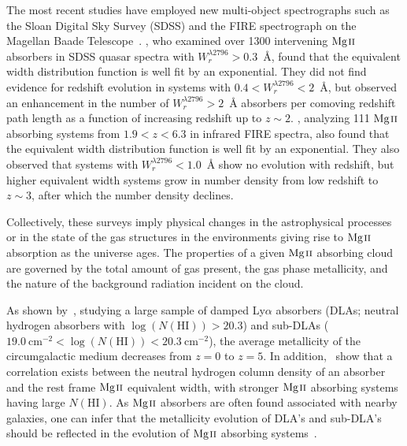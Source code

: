 \documentclass[iop,apj,numberedappendix,appendixfloats,twocolappendix]{emulateapj}
\begin{document}
The most recent studies have employed new multi-object spectrographs such as the Sloan Digital Sky Survey (SDSS) and the FIRE spectrograph on the Magellan Baade Telescope~\citep{Nestor2005,Matejek2012}. \cite{Nestor2005}, who examined over 1300 intervening ${\hbox{{\rm Mg}\kern 0.1em{\sc ii}}}$ absorbers in SDSS quasar spectra with $W_r^{\lambda2796} > 0.3$~{\AA}, found that the equivalent width distribution function is well fit by an exponential. They did not find evidence for redshift evolution in systems with $0.4 < W_r^{\lambda2796} < 2$~{\AA}, but observed an enhancement in the number of $W_r^{\lambda2796} > 2$~{\AA} absorbers per comoving redshift path length as a function of increasing redshift up to $z \sim 2$. \cite{Matejek2012}, analyzing 111 ${\hbox{{\rm Mg}\kern 0.1em{\sc ii}}}$ absorbing systems from $1.9 < z < 6.3$ in infrared FIRE spectra, also found that the equivalent width distribution function is well fit by an exponential. They also observed that systems with $W_r^{\lambda2796} < 1.0$~{\AA} show no evolution with redshift, but higher equivalent width systems grow in number density from low redshift to $z \sim 3$, after which the number density declines.

Collectively, these surveys imply physical changes in the astrophysical processes or in the state of the gas structures in the environments giving rise to ${\hbox{{\rm Mg}\kern 0.1em{\sc ii}}}$ absorption as the universe ages. The properties of a given ${\hbox{{\rm Mg}\kern 0.1em{\sc ii}}}$ absorbing cloud are governed by the total amount of gas present, the gas phase metallicity, and the nature of the background radiation incident on the cloud.

As shown by~\cite{Quiret2016}, studying a large sample of damped Ly$\alpha$ absorbers (DLAs; neutral hydrogen absorbers with $\log(N(\mathrm{HI})) > 20.3$) and sub-DLAs ($19.0~\mathrm{cm^{-2}} < \log(N(\mathrm{HI})) < 20.3~\mathrm{cm^{-2}}$), the average metallicity of the circumgalactic medium decreases from $z = 0$ to $z = 5$. In addition,~\cite{Menard2009} show that a correlation exists between the neutral hydrogen column density of an absorber and the rest frame ${\hbox{{\rm Mg}\kern 0.1em{\sc ii}}}$ equivalent width, with stronger ${\hbox{{\rm Mg}\kern 0.1em{\sc ii}}}$ absorbing systems having large $N(\mathrm{HI})$. As ${\hbox{{\rm Mg}\kern 0.1em{\sc ii}}}$ absorbers are often found associated with nearby galaxies, one can infer that the metallicity evolution of DLA's and sub-DLA's should be reflected in the evolution of ${\hbox{{\rm Mg}\kern 0.1em{\sc ii}}}$ absorbing systems~\citep{Kulkarni2002,Prochaska2003,Kulkarni2005,Kulkarni2007}. 

\end{document}
